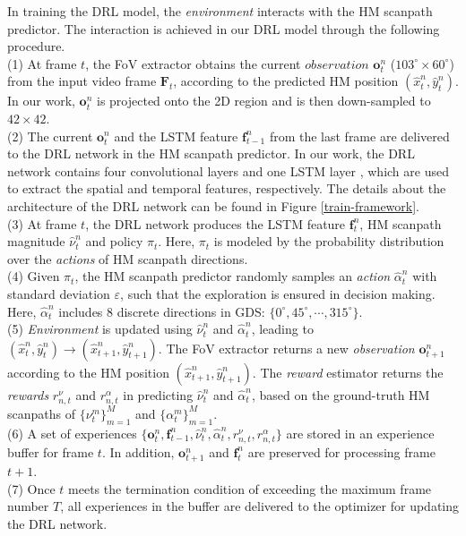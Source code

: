 \documentclass[10pt,journal,compsoc]{IEEEtran}
\begin{document}
In training the DRL model,  the \textit{environment} interacts with the HM scanpath predictor.
The interaction is achieved in our DRL model through the following procedure.\\
(1) At frame $t$, the FoV extractor obtains the current $\textit{observation}$ $\mathbf{o}^n_t$ ($103^{\circ} \times 60^{\circ}$) from the input video frame $\mathbf{F}_t$, according to the predicted HM position $(\hat{x}^n_t,\hat{y}^n_t)$.
In our work, $\mathbf{o}^n_{t}$ is projected onto the 2D region and is then down-sampled to $42\times42$.\\
(2) The current $\mathbf{o}^n_t$ and the LSTM feature $\mathbf{f}^n_{t-1}$ from  the last frame are delivered to the DRL network in the HM scanpath predictor.
In our work, the DRL network contains four convolutional layers and one LSTM layer \cite{hausknecht2015deep}, which are used to extract the spatial and temporal features, respectively. The details about the architecture of the DRL network can be found in Figure \ref{train-framework}.\\
(3) At frame $t$, the DRL network produces the LSTM feature $\mathbf{f}^n_{t}$, HM scanpath magnitude $\hat{\nu}^n_{t}$ and policy $\pi_{t}$. Here, $\pi_{t}$ is modeled by the probability distribution over the \textit{actions} of HM scanpath directions.\\
(4) Given $\pi_{t}$, the HM scanpath predictor randomly samples an \textit{action} $\hat{\alpha}^n_t$ with standard deviation $\varepsilon$, such that the exploration is ensured in decision making. Here, $\hat{\alpha}^n_t$ includes 8 discrete directions in GDS: $\{ 0^{\circ}, 45^{\circ}, \cdots, 315^{\circ} \}$.\\
(5) \textit{Environment} is updated using $\hat{\nu}^n_t$ and $\hat{\alpha}^n_t$, leading to $(\hat{x}^n_t, \hat{y}^n_t)\longrightarrow (\hat{x}^n_{t+1},\hat{y}^n_{t+1})$. The FoV extractor returns a new \textit{observation} $\mathbf{o}^n_{t+1}$ according to the HM position $(\hat{x}^n_{t+1},\hat{y}^n_{t+1})$. The \textit{reward} estimator returns the \textit{rewards} $r^{\nu}_{n,t}$ and $r^{\alpha}_{n,t}$ in predicting $\hat{\nu}^n_t$ and $\hat{\alpha}^n_t$, based on the ground-truth HM scanpaths of $\{\nu^m_t\}_{m=1}^{M}$ and $\{\alpha^m_t\}_{m=1}^{M}$. \\
(6) A set of experiences $\{ \mathbf{o}^n_{t}, \! \mathbf{f}^n_{t-1},\! \hat{\nu}^n_t,\! \hat{\alpha}^n_t,\! r^{\nu}_{n,t},\! r^{\alpha}_{n,t} \}$ are stored in an experience buffer for frame $t$.
In addition, $\mathbf{o}^n_{t+1}$ and $\mathbf{f}^n_{t}$ are preserved for processing frame $t+1$.\\
(7) Once $t$ meets the termination condition of exceeding the maximum frame number $T$, all experiences in the buffer are delivered to the optimizer for updating the DRL network.
\end{document}
